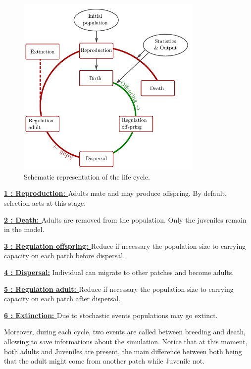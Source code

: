 \documentclass[letterpaper,12pt,oneside]{book}
\begin{document}
\begin{figure}[h]
    \centering
        \includegraphics[width=0.80\textwidth]{life_cycle.pdf}
        \caption{Schematic representation of the life cycle.}
    \label{fig:life-cycle}
\end{figure}
\begin{description}
\item \textbf{\hyperref[sec:MatingSystem]{1 : Reproduction: }} Adults mate and may produce offspring. By default, selection acts at this stage.
\item \textbf{\hyperref[sec:Death]{2 : Death: }} Adults are removed from the population. Only the juveniles remain in the model.
\item \textbf{\hyperref[sec:RegulationOffspring]{3 : Regulation offspring: }} Reduce if necessary the population size to carrying capacity on each patch before dispersal. 
\item \textbf{\hyperref[sec:Dispersal]{4 : Dispersal:}} Individual can migrate to other patches and become adults. 
\item \textbf{\hyperref[sec:RegulationAdults]{5 : Regulation adult: }} Reduce if necessary the population size to carrying capacity on each patch after dispersal. 
\item \textbf{\hyperref[sec:Extinction]{6 : Extinction: }} Due to stochastic events populations may go extinct.
\end{description}
Moreover, during each cycle,  two events are called between breeding and death, allowing to save informations about the simulation.  Notice that at this moment, both adults and Juveniles are present, the main difference between both being that the adult might come from another patch while Juvenile not. 
\end{document}
